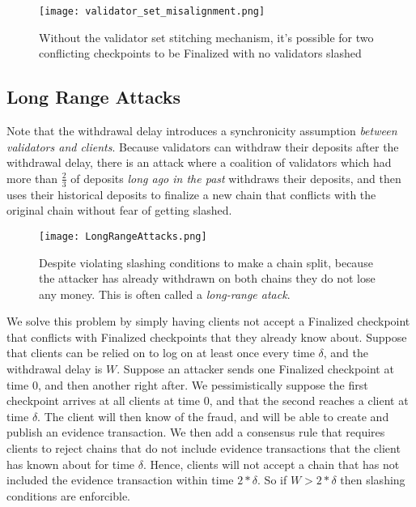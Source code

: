 \documentclass[12pt]{article}
\begin{document}
\begin{figure}[h!tb]
\centering
\texttt{[image: validator\_set\_misalignment.png]}
\caption{Without the validator set stitching mechanism, it's possible for two conflicting checkpoints to be Finalized with no validators slashed}
\label{fig:dynamic2}
\end{figure}

\subsection{Long Range Attacks}

Note that the withdrawal delay introduces a synchronicity assumption \textit{between validators and clients}. Because validators can withdraw their deposits after the withdrawal delay, there is an attack where a coalition of validators which had more than $\frac{2}{3}$ of deposits \textit{long ago in the past} withdraws their deposits, and then uses their historical deposits to finalize a new chain that conflicts with the original chain without fear of getting slashed.

\begin{figure}[h!tb]
\centering
\texttt{[image: LongRangeAttacks.png]}
\caption{Despite violating slashing conditions to make a chain split, because the attacker has already withdrawn on both chains they do not lose any money. This is often called a \textit{long-range atack}.}
\label{fig:dynamic3}
\end{figure}

We solve this problem by simply having clients not accept a Finalized checkpoint that conflicts with Finalized checkpoints that they already know about. Suppose that clients can be relied on to log on at least once every time $\delta$, and the withdrawal delay is $W$. Suppose an attacker sends one Finalized checkpoint at time $0$, and then another right after. We pessimistically suppose the first checkpoint arrives at all clients at time $0$, and that the second reaches a client at time $\delta$. The client will then know of the fraud, and will be able to create and publish an evidence transaction. We then add a consensus rule that requires clients to reject chains that do not include evidence transactions that the client has known about for time $\delta$. Hence, clients will not accept a chain that has not included the evidence transaction within time $2 * \delta$. So if $W > 2 * \delta$ then slashing conditions are enforcible.
\end{document}
